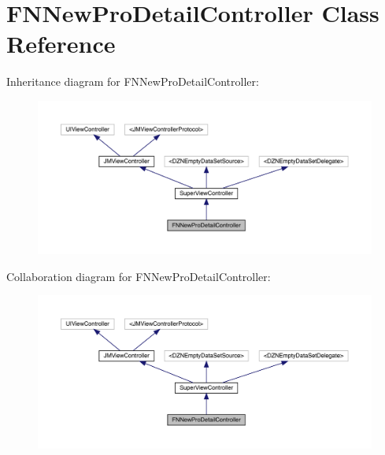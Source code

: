 \hypertarget{interface_f_n_new_pro_detail_controller}{}\section{F\+N\+New\+Pro\+Detail\+Controller Class Reference}
\label{interface_f_n_new_pro_detail_controller}


Inheritance diagram for F\+N\+New\+Pro\+Detail\+Controller\+:\nopagebreak
\begin{figure}[H]
\begin{center}
\leavevmode
\includegraphics[width=350pt]{interface_f_n_new_pro_detail_controller__inherit__graph}
\end{center}
\end{figure}


Collaboration diagram for F\+N\+New\+Pro\+Detail\+Controller\+:\nopagebreak
\begin{figure}[H]
\begin{center}
\leavevmode
\includegraphics[width=350pt]{interface_f_n_new_pro_detail_controller__coll__graph}
\end{center}
\end{figure}
